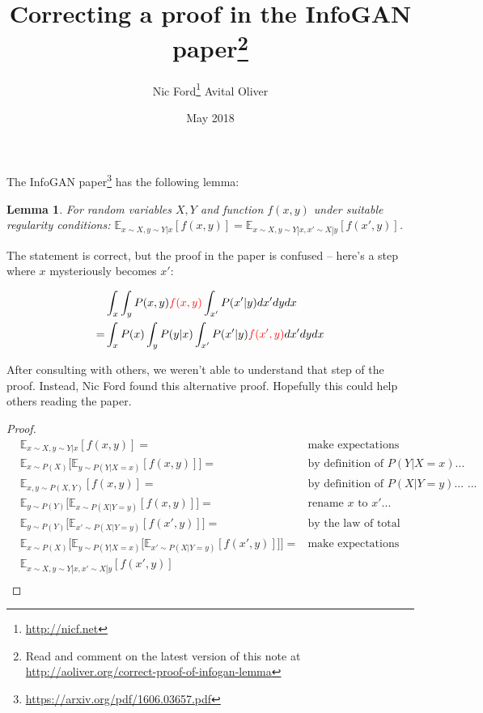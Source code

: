 \documentclass{article}
\title{Correcting a proof in the InfoGAN paper\footnote{Read and comment on the latest version of this note at \url{http://aoliver.org/correct-proof-of-infogan-lemma}}
}
\author{Nic Ford\footnote{\url{http://nicf.net}} \cr Avital Oliver}
\date{May 2018}
\newtheorem{lemma}[theorem]{Lemma}
\begin{document}
\maketitle


The
InfoGAN paper\footnote{\url{https://arxiv.org/pdf/1606.03657.pdf}} %
has the following lemma:

\setcounter{section}{5} %

\begin{lemma}
For random variables $X, Y$ and function $f(x, y)$ under suitable regularity conditions:
$\mathbb{E}_{x \sim X, y \sim Y|x}[f(x, y)] = 
 \mathbb{E}_{x \sim X, y \sim Y|x, x' \sim X|y}[f(x', y)]$.
\end{lemma}

The statement is correct, but the proof in the paper is confused -- here's a step where $x$ mysteriously becomes $x'$:


\begin{align*}
& \int_x \int_y P(x,y) {\color{red}{f(x,y)}} \int_{x'} P(x' | y)dx'dydx \\
= & \int_x P(x) \int_y P(y|x) \int_{x'} P(x'|y) {\color{red}{f(x',y)}} dx' dy dx
\end{align*}

After consulting with others, we weren't able to understand that step of the proof. Instead,
Nic Ford %
found this alternative proof. Hopefully this could help others reading the paper.

\begin{proof}
\begin{align*}
   & \mathbb{E}_{x \sim X,y \sim Y|x}[f(x, y)] = & \mbox{make expectations explicit...} \\
   & \mathbb{E}_{x \sim P(X)}\big[\mathbb{E}_{y \sim P(Y|X=x)}[f(x, y)]\big] = & \mbox{by definition of $P(Y|X=x)$...} \\
   & \mathbb{E}_{x,y \sim P(X,Y)}[f(x, y)] = & \mbox{by definition of $P(X|Y=y)$... ...} \\
   & \mathbb{E}_{y \sim P(Y)}\big[\mathbb{E}_{x \sim P(X|Y=y)}[f(x, y)]\big] = & \mbox{rename $x$ to $x'$...} \\
   & \mathbb{E}_{y \sim P(Y)}\big[\mathbb{E}_{x' \sim P(X|Y=y)}[f(x', y)]\big] = & \mbox{by the law of total expectation...} \\
   & \mathbb{E}_{x \sim P(X)}\Big[\mathbb{E}_{y \sim P(Y|X=x)}\big[\mathbb{E}_{x' \sim P(X|Y=y)}[f(x', y)]\big]\Big] = &  \mbox{make expectations implicit...} \\
   & \mathbb{E}_{x \sim X,y \sim Y|x,x' \sim X|y}[f(x', y)] & \\
\end{align*}
\end{proof}

\end{document}
